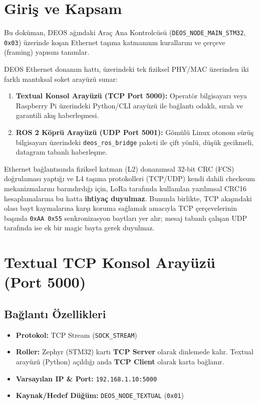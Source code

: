 \documentclass[a4paper,10pt]{article}
\newcommand{\hex}[1]{\texttt{0x#1}}
\newcommand{\code}[1]{\texttt{#1}}
\begin{document}
\section{Giriş ve Kapsam}
Bu doküman, DEOS ağındaki Araç Ana Kontrolcüsü (\code{DEOS\_NODE\_MAIN\_STM32}, \hex{03}) üzerinde koşan Ethernet taşıma katmanının kurallarını ve çerçeve (framing) yapısını tanımlar. 

DEOS Ethernet donanım hattı, üzerindeki tek fiziksel PHY/MAC üzerinden iki farklı mantıksal soket arayüzü sunar:
\begin{enumerate}
    \item \textbf{Textual Konsol Arayüzü (TCP Port 5000):} Operatör bilgisayarı veya Raspberry Pi üzerindeki Python/CLI arayüzü ile bağlantı odaklı, sıralı ve garantili akış haberleşmesi.
    \item \textbf{ROS 2 Köprü Arayüzü (UDP Port 5001):} Gömülü Linux otonom sürüş bilgisayarı üzerindeki \code{deos\_ros\_bridge} paketi ile çift yönlü, düşük gecikmeli, datagram tabanlı haberleşme.
\end{enumerate}

Ethernet bağlantısında fiziksel katman (L2) donanımsal 32-bit CRC (FCS) doğrulaması yaptığı ve L4 taşıma protokolleri (TCP/UDP) kendi dahili checksum mekanizmalarını barındırdığı için, LoRa tarafında kullanılan yazılımsal CRC16 hesaplamalarına bu hatta \textbf{ihtiyaç duyulmaz}. Bununla birlikte, TCP akışındaki olası bayt kaymalarına karşı koruma sağlamak amacıyla TCP çerçevelerinin başında \code{0xAA 0x55} senkronizasyon baytları yer alır; mesaj tabanlı çalışan UDP tarafında ise ek bir magic bayta gerek duyulmaz.

\section{Textual TCP Konsol Arayüzü (Port 5000)}

\subsection{Bağlantı Özellikleri}
\begin{itemize}
    \item \textbf{Protokol:} TCP Stream (\code{SOCK\_STREAM})
    \item \textbf{Roller:} Zephyr (STM32) kartı \textbf{TCP Server} olarak dinlemede kalır. Textual arayüzü (Python) açıldığı anda \textbf{TCP Client} olarak karta bağlanır.
    \item \textbf{Varsayılan IP \& Port:} \code{192.168.1.10:5000}
    \item \textbf{Kaynak/Hedef Düğüm:} \code{DEOS\_NODE\_TEXTUAL} (\hex{01})
\end{itemize}
\end{document}
